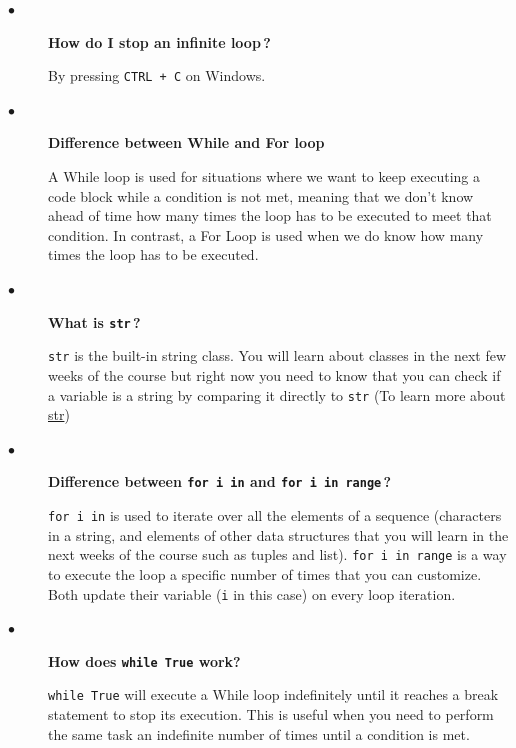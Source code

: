 \documentclass{article}
\newcommand{\inlinecode}[1]{\texttt{#1}}
\newcommand{\link}[2]{\textcolor{blue}{\href{#2}{#1}}}
\newcommand{\question}[1]{\item[$\bullet$] 
	\begin{minipage}[t]{\textwidth}
		\bfseries#1
	\end{minipage}
	\hfil
}
\newenvironment{answer}{}{}
\newenvironment{faq}{\begin{description}}{\end{description}}
\begin{document}
\begin{faq}
		\question{How do I stop an infinite loop\,?}
		\begin{answer}
			By pressing \texttt{CTRL + C} on Windows.
		\end{answer}
		
		\question{Difference between While and For loop}
		\begin{answer}
			A While loop is used for situations where we want to keep executing a code
			block while a condition is not met, meaning that we don't know ahead of time
			how many times the loop has to be executed to meet that condition. In
			contrast, a For Loop is used when we do know how many times the loop has
			to be executed.
		\end{answer}
		
		\question{What is \inlinecode{str}\,?}
		\begin{answer}
			\inlinecode{str} is the built-in string class. You will learn about classes in the next few
			weeks of the course but right now you need to know that you can check if a
			variable is a string by comparing it directly to \inlinecode{str} (To learn more about \link{str}{https://docs.python.org/3/library/functions.html\#func-str})
		\end{answer}
		
		\question{Difference between \inlinecode{for i in} and \inlinecode{for i in range}\,?}
		\begin{answer}
			\inlinecode{for i in} is used to iterate over all the elements of a sequence (characters in a
			string, and elements of other data structures that you will learn in the next
			weeks of the course such as tuples and list). \inlinecode{for i in range} is a way to
			execute the loop a specific number of times that you can customize. Both
			update their variable (\inlinecode{i} in this case) on every loop iteration.
		\end{answer}
		
		\question{How does \inlinecode{while True} work?}
		\begin{answer}
			\inlinecode{while True} will execute a While loop indefinitely until it reaches a break
			statement to stop its execution. This is useful when you need to perform the
			same task an indefinite number of times until a condition is met.
		\end{answer}
		
	\end{faq}
	
\end{document}
